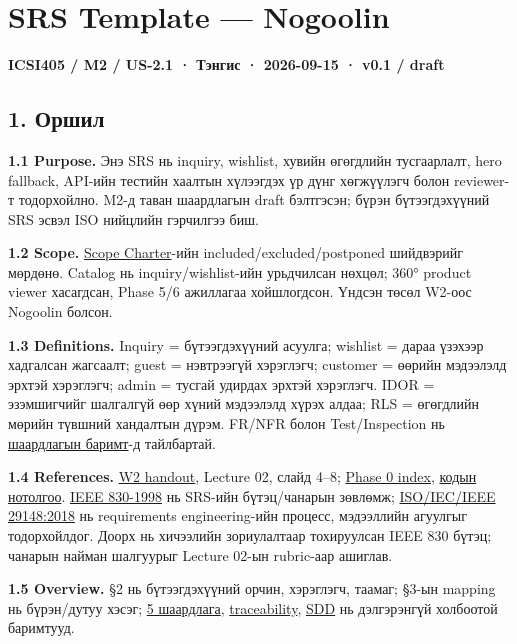 \section{SRS Template --- Nogoolin}\label{doc3-srs-template-nogoolin}

\textbf{ICSI405 / M2 / US-2.1 · Тэнгис · 2026-09-15 · v0.1 / draft}

\subsection{1. Оршил}\label{doc3-ux43eux440ux448ux438ux43b}

\textbf{1.1 Purpose.} Энэ SRS нь inquiry, wishlist, хувийн өгөгдлийн
тусгаарлалт, hero fallback, API-ийн тестийн хаалтын хүлээгдэх үр дүнг
хөгжүүлэгч болон reviewer-т тодорхойлно. M2-д таван шаардлагын draft
бэлтгэсэн; бүрэн бүтээгдэхүүний SRS эсвэл ISO нийцлийн гэрчилгээ биш.

\textbf{1.2 Scope.} \href{../../requirements/scope-charter.md}{Scope
Charter}-ийн included/excluded/postponed шийдвэрийг мөрдөнө. Catalog нь
inquiry/wishlist-ийн урьдчилсан нөхцөл; 360° product viewer хасагдсан,
Phase 5/6 ажиллагаа хойшлогдсон. Үндсэн төсөл W2-оос Nogoolin болсон.

\textbf{1.3 Definitions.} Inquiry = бүтээгдэхүүний асуулга; wishlist =
дараа үзэхээр хадгалсан жагсаалт; guest = нэвтрээгүй хэрэглэгч; customer
= өөрийн мэдээлэлд эрхтэй хэрэглэгч; admin = тусгай удирдах эрхтэй
хэрэглэгч. IDOR = эзэмшигчийг шалгалгүй өөр хүний мэдээлэлд хүрэх алдаа;
RLS = өгөгдлийн мөрийн түвшний хандалтын дүрэм. FR/NFR болон
Test/Inspection нь \href{../../requirements/requirements.md}{шаардлагын
баримт}-д тайлбартай.

\textbf{1.4 References.}
\href{Software_Project_Documentation_Week_02_Handout.pdf}{W2 handout},
Lecture 02, слайд 4--8; \href{../../phase-0/README.md}{Phase 0 index},
\href{../../requirements/traceability-matrix.md}{кодын нотолгоо}.
\href{https://ieeexplore.ieee.org/document/720574}{IEEE 830-1998} нь
SRS-ийн бүтэц/чанарын зөвлөмж;
\href{https://www.iso.org/standard/72089.html}{ISO/IEC/IEEE 29148:2018}
нь requirements engineering-ийн процесс, мэдээллийн агуулгыг
тодорхойлдог. Доорх нь хичээлийн зориулалтаар тохируулсан IEEE 830
бүтэц; чанарын найман шалгуурыг Lecture 02-ын rubric-аар ашиглав.

\textbf{1.5 Overview.} §2 нь бүтээгдэхүүний орчин, хэрэглэгч, таамаг;
§3-ын mapping нь бүрэн/дутуу хэсэг;
\href{../../requirements/requirements.md}{5 шаардлага},
\href{../../requirements/traceability-matrix.md}{traceability},
\href{../../architecture/sdd-template.md}{SDD} нь дэлгэрэнгүй холбоотой
баримтууд.

